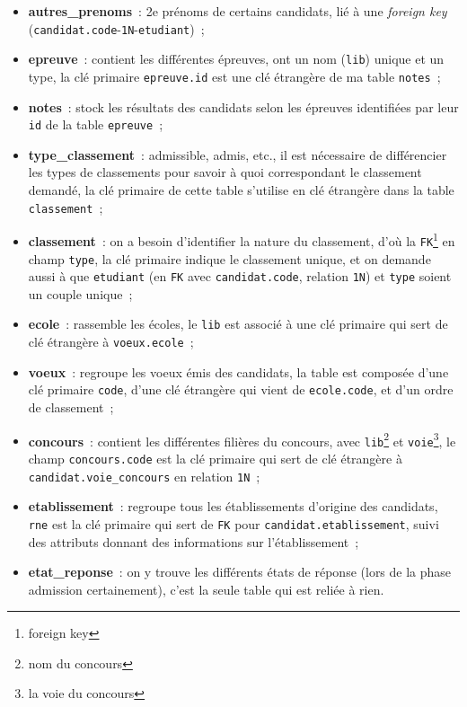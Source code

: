 \documentclass[12pt]{article}
\begin{document}
\begin{itemize}[label=\textbullet]
            \item \textbf{autres\_prenoms}~: 2e prénoms de certains candidats, lié à une \textsl{foreign key} (\texttt{candidat.code}-\texttt{1N}-\texttt{etudiant})~; 
            \item \textbf{epreuve}~: contient les différentes épreuves, ont un nom (\texttt{lib}) unique et un type, la clé primaire \texttt{epreuve.id} est une clé étrangère de ma table \texttt{notes}~; 
            \item \textbf{notes}~: stock les résultats des candidats selon les épreuves identifiées par leur \texttt{id} de la table \texttt{epreuve}~;
            \item \textbf{type\_classement}~: admissible, admis, etc., il est nécessaire de différencier les types de classements pour savoir à quoi correspondant le classement demandé, la clé primaire de cette table s'utilise en clé étrangère dans la table \texttt{classement}~;
            \item \textbf{classement}~: on a besoin d'identifier la nature du classement, d'où la \texttt{FK}\footnote{foreign key} en champ \texttt{type}, la clé primaire indique le classement unique, et on demande aussi à que \texttt{etudiant} (en \texttt{FK} avec \texttt{candidat.code}, relation \texttt{1N}) et \texttt{type} soient un couple unique~; 
            \item \textbf{ecole}~: rassemble les écoles, le \texttt{lib} est associé à une clé primaire qui sert de clé étrangère à \texttt{voeux.ecole}~; 
            \item \textbf{voeux}~: regroupe les voeux émis des candidats, la table est composée d'une clé primaire \texttt{code}, d'une clé étrangère qui vient de \texttt{ecole.code}, et d'un ordre de classement~;
            \item \textbf{concours}~: contient les différentes filières du concours, avec \texttt{lib}\footnote{nom du concours} et \texttt{voie}\footnote{la voie du concours}, le champ \texttt{concours.code} est la clé primaire qui sert de clé étrangère à \texttt{candidat.voie\_concours} en relation \texttt{1N}~;
            \item \textbf{etablissement}~: regroupe tous les établissements d'origine des candidats, \texttt{rne} est la clé primaire qui sert de \texttt{FK} pour \texttt{candidat.etablissement}, suivi des attributs donnant des informations sur l'établissement~;
            \item \textbf{etat\_reponse}~: on y trouve les différents états de réponse (lors de la phase admission certainement), c'est la seule table qui est reliée à rien.
        \end{itemize}
\end{document}
